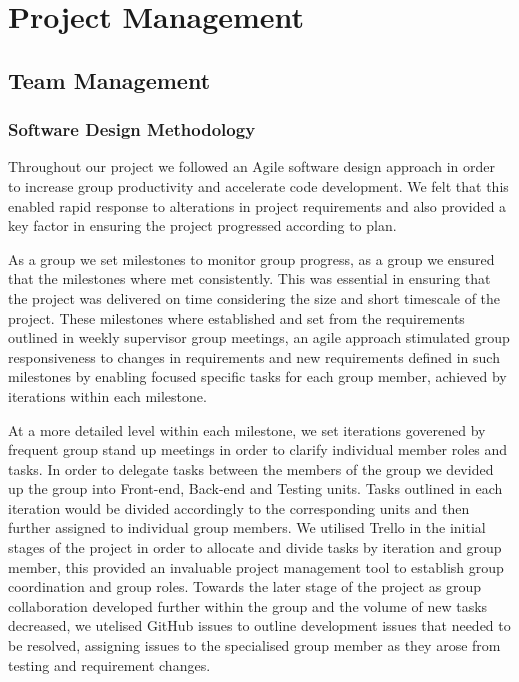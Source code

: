 \section{Project Management}

\subsection{Team Management}
\subsubsection{Software Design Methodology}
Throughout our project we followed an Agile software design approach in order to increase group productivity and accelerate code development. We felt that this enabled rapid response to alterations in project requirements and also provided a key factor in ensuring the project progressed according to plan.

As a group we set milestones to monitor group progress, as a group we ensured that the milestones where met consistently. This was essential in ensuring that the project was delivered on time considering the size and short timescale of the project. These milestones where established and set from the requirements outlined in weekly supervisor group meetings, an agile approach stimulated group responsiveness to changes in requirements and new requirements defined in such milestones by enabling focused specific tasks for each group member, achieved by iterations within each milestone. 

At a more detailed level within each milestone, we set iterations goverened by frequent group stand up meetings in order to clarify individual member roles and tasks. In order to delegate tasks between the members of the group we devided up the group into Front-end, Back-end and Testing units. Tasks outlined in each iteration would be divided accordingly to the corresponding units and then further assigned to individual group members. We utilised Trello in the initial stages of the project in order to allocate and divide tasks by iteration and group member, this provided an invaluable project management tool to establish group coordination and group roles. Towards the later stage of the project as group collaboration developed further within the group and the volume of new tasks decreased, we utelised GitHub issues to outline development issues that needed to be resolved, assigning issues to the specialised group member as they arose from testing and requirement changes.

